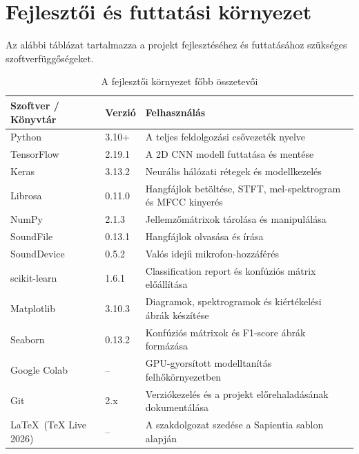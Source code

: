 \clearpage
\section{Fejlesztői és futtatási környezet}
\label{sec:fejlesztoi_kornyezet}

Az alábbi táblázat tartalmazza a projekt fejlesztéséhez és futtatásához szükséges szoftverfüggőségeket.

\begin{table}[H]
\centering
\caption{A fejlesztői környezet főbb összetevői}
\label{tab:fejlesztoi_kornyezet}
\begin{tabular}{p{4.2cm}p{2.5cm}p{7.5cm}}
\toprule
\textbf{Szoftver / Könyvtár} & \textbf{Verzió} & \textbf{Felhasználás} \\
\midrule
Python & 3.10+ & A teljes feldolgozási csővezeték nyelve \\
\addlinespace
TensorFlow & 2.19.1 & A 2D CNN modell futtatása és mentése \\
\addlinespace
Keras & 3.13.2 & Neurális hálózati rétegek és modellkezelés \\
\addlinespace
Librosa & 0.11.0 & Hangfájlok betöltése, STFT, mel-spektrogram és MFCC kinyerés \\
\addlinespace
NumPy & 2.1.3 & Jellemzőmátrixok tárolása és manipulálása \\
\addlinespace
SoundFile & 0.13.1 & Hangfájlok olvasása és írása \\
\addlinespace
SoundDevice & 0.5.2 & Valós idejű mikrofon-hozzáférés \\
\addlinespace
scikit-learn & 1.6.1 & Classification report és konfúziós mátrix előállítása \\
\addlinespace
Matplotlib & 3.10.3 & Diagramok, spektrogramok és kiértékelési ábrák készítése \\
\addlinespace
Seaborn & 0.13.2 & Konfúziós mátrixok és F1-score ábrák formázása \\
\addlinespace
Google Colab & -- & GPU-gyorsított modelltanítás felhőkörnyezetben \\
\addlinespace
Git & 2.x & Verziókezelés és a projekt előrehaladásának dokumentálása \\
\addlinespace
\LaTeX\ (TeX Live 2026) & -- & A szakdolgozat szedése a Sapientia sablon alapján \\
\bottomrule
\end{tabular}
\end{table}
